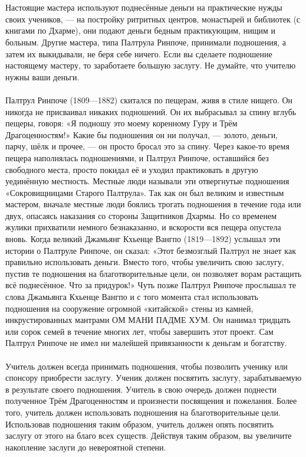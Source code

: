 \\ \\ Настоящие мастера используют поднесённые деньги на практические нужды своих учеников, — на постройку ритритных центров, монастырей и библиотек (с книгами по Дхарме), они подают деньги бедным практикующим, нищим и больным. Другие мастера, типа Палтрула Ринпоче, принимали подношения, а затем их выкидывали, не беря себе ничего. Если вы сделаете подношение настоящему мастеру, то заработаете большую заслугу. Не думайте, что учителю нужны ваши деньги.
\\ \\ Палтрул Ринпоче (1809—1882) скитался по пещерам, живя в стиле нищего. Он никогда не присваивал никаких подношений. Он их выбрасывал за спину вглубь пещеры, говоря: «Я подношу это моему коренному Гуру и Трём Драгоценностям!» Какие бы подношения он ни получал, — золото, деньги, парчу, шёлк и прочее, — он просто бросал это за спину. Через какое-то время пещера наполнялась подношениями, и Палтрул Ринпоче, оставшийся без свободного места, просто покидал её и уходил практиковать в другую уединённую местность. Местные люди называли эти отвергнутые подношения «Сокровищницами Старого Палтрула». Так как он был великим и известным мастером, вначале местные люди боялись трогать подношения в течение года или двух, опасаясь наказания со стороны Защитников Дхармы. Но со временем жулики прихватили немного безнаказанно, и вскорости вся пещера опустела вновь. Когда великий Джамьянг Кхьенце Вангпо (1819—1892) услышал эти истории о Палтруле Ринпоче, он сказал: «Этот безмозглый Палтрул не знает как правильно использовать деньги. Вместо того, чтобы увеличить свою заслугу, пустив те подношения на благотворительные цели, он позволяет ворам растащить всё поднесённое. Что за придурок!» Чуть позже Палтрул Ринпоче прослышал те слова Джамьянга Кхьенце Вангпо и с того момента стал использовать подношения на сооружение огромной «китайской» стены из камней, инкрустированных мантрами ОМ МАНИ ПАДМЕ ХУМ. Он нанимал тридцать или сорок семей в течение многих лет, чтобы завершить этот проект. Сам Палтрул Ринпоче не имел ни малейшей привязанности к деньгам и богатству.
\\ \\ Учитель должен всегда принимать подношения, чтобы позволить ученику или спонсору приобрести заслугу. Ученик должен посвятить заслугу, зарабатываемую в результате своего подношения. Учитель в свою очередь должен поднести получен\-ное Трём Драгоценностям и произнести посвящения и пожела\-ния. Более того, учитель должен использовать подношения на благотворительные цели. Использовав подношения таким образом, учитель должен опять посвятить заслугу от этого на благо всех существ. Действуя таким образом, вы увеличите накопление заслуги до невероятной степени.
